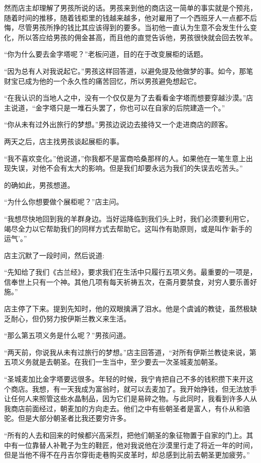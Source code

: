 \documentclass[twoside,openany]{book}
\begin{document}
然而店主却理解了男孩所说的话。男孩来到他的商店这一简单的事实就是个预兆，随着时间的推移，随着钱柜里的钱越来越多，他对雇用了一个西班牙人一点都不后悔，尽管男孩所挣的钱比其应该得到的要多。当初他一直认为生意不会发生什么变化，所以答应给男孩的佣金甚高，而且他的直觉告诉他，男孩很快就会回去牧羊。

“你为什么要去金字塔呢？”老板问道，目的在于改变展柜的话题。

“因为总有人对我说起它。”男孩这样回答道，以避免提及他做梦的事。如今，那笔财宝已成为他的一个永久性的痛苦回忆，所以男孩避免想起它。

“在我认识的当地人之中，没有一个仅仅是为了去看看金字塔而想要穿越沙漠。”店主说道，“金字塔只是一堆石头罢了，你也可以在自家的后院建造一个。”

“你从未有过外出旅行的梦想。”男孩边说边去接待又一个走进商店的顾客。

两天之后，店主找男孩谈起展柜的事。

“我不喜欢变化。”他说道，”你我都不是富商哈桑那样的人。如果他在一笔生意上出现失误，对他不会有太大的影响。但是我们却要永远为我们的失误去吃苦头。”

的确如此，男孩想道。

“为什么你想要做个展柜呢？”店主问。

“我想尽快地回到我的羊群身边。当好运降临到我们头上时，我们必须要利用它，竭尽全力以它帮助我们的同样方式去帮助它。这叫作有助原则，或是叫作‘新手的运气'。”

店主沉默了一段时间，然后说道:

“先知给了我们《古兰经》，要求我们在生活中只履行五项义务。最重要的一项是，信奉世上只有一个神。其他几项有每天祈祷五次，在斋月要禁食，对穷人要乐善好施。”

店主停了下来。提到先知时，他的双眼擒满了泪水。他是个虞诚的教徒，虽然极缺乏耐心，但仍努力按伊斯兰教义来生活。

“那么第五项义务是什么呢？”男孩问道。

“两天前，你说我从未有过旅行的梦想。”店主回答道，“对所有伊斯兰教徒来说，第五项义务就是去朝圣。在我们一生当中，至少要去一次圣城麦加朝圣。

“圣城麦加比金字塔要远很多。年轻的时候，我宁肯把自己不多的钱积攒下来开这个商店。我想，有一天我成为富翁时，就可以去麦加了。我开始挣钱，但无法放手让任何人来照管这些水晶制品，因为它们是易碎之物。与此同时，我看到许多人从我商店前面经过，朝麦加的方向走去。他们之中有些朝圣者是富人，有仆从和骆驼。但是大部分朝圣者比我还要穷许多。

“所有的人去和回来的时候都兴高采烈，把他们朝圣的象征物置于自家的门上。其中有一位靠替人补靴子为生的鞋匠，他对我说他在沙漠里行走了将近一年的时间，但是当他不得不在丹吉尔穿街走巷购买皮革时，却总感到比前去朝圣更加疲劳。”
\end{document}
